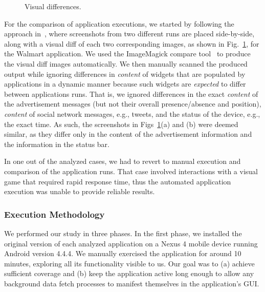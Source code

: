 \begin{figure}[!t]
{    }%
%
    \vspace{-0.1in}
    \caption{Visual differences.}
       \vspace{-0.1in}
    \label{fig:screenshots}
    \vspace{-0.1in}
\end{figure}

For the comparison of application executions, we started by following the approach in~\cite{Hornyack:Han:Jung:Schechter:Wetherall:CCS11}, where screenshots from two different runs are placed side-by-side, 
along with a visual diff of each two corresponding images, as shown in Fig.~\ref{fig:screenshots}, for 
the Walmart application. 
We used the ImageMagick compare tool~\cite{imagemagick}
to produce the visual diff images automatically. 
We then manually scanned the produced output while ignoring differences in \emph{content} of 
widgets that are populated by applications in a dynamic manner because such widgets are \emph{expected} to differ between applications runs.
That is, we ignored differences in the exact \emph{content} of the advertisement messages (but not their overall presence/absence and position), 
\emph{content} of social network messages, e.g., tweets, and the status of the device, e.g., the exact time. As such, the screenshots in Figs~\ref{fig:screenshots}(a) and (b) were deemed similar, as they differ only in the content of the advertisement information and the information in the status bar.

In one out of the analyzed cases, we had to revert to manual execution and comparison of the application runs.
That case involved interactions with a visual game that required rapid response time, 
thus the automated application execution was unable to provide reliable results. 


\subsubsection{Execution Methodology}
We performed our study in three phases. In the first phase, 
we installed the original version of each analyzed 
application on a Nexus 4 mobile device running Android version 4.4.4.
We manually exercised the application for around 10 minutes, exploring all its functionality visible to us. Our goal was to (a) achieve sufficient coverage and (b) keep the application active long enough to allow any background data fetch processes to manifest themselves in the application's GUI. 
 
